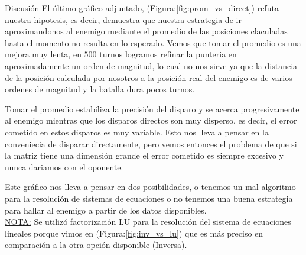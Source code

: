 \begin{section}{Discusión}
	El último gráfico adjuntado, (Figura:\ref{fig:prom_vs_direct}) refuta nuestra hipotesis, es decir, demuestra que nuestra estrategia de ir aproximandonos al enemigo mediante el promedio de las posiciones claculadas hasta el momento no resulta en lo esperado. Vemos que tomar el promedio es una mejora muy lenta, en $500$ turnos logramos refinar la punteria en aproximadamente un orden de magnitud, lo cual no nos sirve ya que la distancia de la posición calculada por nosotros a la posición real del enemigo es de varios ordenes de magnitud y la batalla dura pocos turnos.
	
	Tomar el promedio estabiliza la precisión del disparo y se acerca progresivamente al enemigo mientras que los disparos directos son muy disperso, es decir, el error cometido en estos disparos es muy variable. Esto nos lleva a pensar en la conveniecia de disparar directamente, pero vemos entonces el problema de que si la matriz tiene una dimensión grande el error cometido es siempre excesivo y nunca dariamos con el oponente.
	
	Este gráfico nos lleva a pensar en dos posibilidades, o tenemos un mal algoritmo para la resolución de sistemas de ecuaciones o no tenemos una buena estrategia para hallar al enemigo a partir de los datos disponibles.\\

	\underline{NOTA:} Se utilizó factorización LU para la resolución del sistema de ecuaciones lineales porque vimos en (Figura:\ref{fig:inv_vs_lu}) que es más preciso en comparación a la otra opción disponible (Inversa). 

\end{section}
